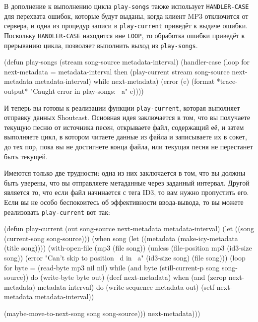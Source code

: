В дополнение к выполнению цикла \lstinline{play-songs} также использует \lstinline{HANDLER-CASE}
для перехвата ошибок, которые будут выданы, когда клиент MP3 отключится от сервера, и одна
из процедур записи в \lstinline{play-current} приведёт к выдаче ошибки. Поскольку
\lstinline{HANDLER-CASE} находится вне \lstinline{LOOP}, то обработка ошибки приведёт к прерыванию
цикла, позволяет выполнить выход из \lstinline{play-songs}.

\begin{myverb}
(defun play-songs (stream song-source metadata-interval)
  (handler-case 
      (loop
         for next-metadata = metadata-interval
         then (play-current 
               stream 
               song-source
               next-metadata
               metadata-interval)
         while next-metadata)
    (error (e) (format *trace-output* "Caught error in play-songs: ~a" e))))
\end{myverb}

И теперь вы готовы к реализации функции \lstinline{play-current}, которая выполняет отправку
данных Shoutcast.  Основная идея заключается в том, что вы получаете текущую песню от
источника песен, открываете файл, содержащий её, и затем выполняете цикл, в котором читаете
данные из файла и записываете их в сокет, до тех пор, пока вы не достигнете конца файла,
или текущая песня не перестанет быть текущей.

Имеются только две трудности: одна из них заключается в том, что вы должны быть уверены,
что вы отправляете метаданные через заданный интервал.  Другой является то, что если файл
начинается с тега ID3, то вам нужно пропустить его.  Если вы не особо беспокоитесь об
эффективности ввода-вывода, то вы можете реализовать \lstinline{play-current} вот так:

\begin{myverb}
(defun play-current (out song-source next-metadata metadata-interval)
  (let ((song (current-song song-source)))
    (when song
      (let ((metadata (make-icy-metadata (title song))))
        (with-open-file (mp3 (file song))
          (unless (file-position mp3 (id3-size song))
            (error "Can't skip to position ~d in ~a" (id3-size song) (file song)))
          (loop for byte = (read-byte mp3 nil nil)
             while (and byte (still-current-p song song-source)) do
               (write-byte byte out)
               (decf next-metadata)
             when (and (zerop next-metadata) metadata-interval) do
               (write-sequence metadata out)
               (setf next-metadata metadata-interval))

          (maybe-move-to-next-song song song-source)))
      next-metadata)))
\end{myverb}

